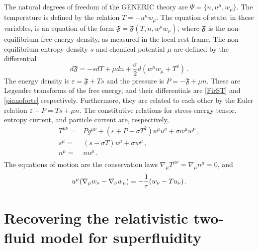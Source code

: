 \documentclass[a4paper, amsfonts, amssymb, amsmath, reprint, showkeys, nofootinbib, twoside, onecolumn, notitlepage]{revtex4-1}
\begin{document}
The natural degrees of freedom of the GENERIC theory are $\Psi=\{n,u^\mu,w_\mu \}$. The temperature is defined by the relation $T=-u^\mu w_\mu$. The equation of state, in these variables, is an equation of the form $\mathfrak{F}=\mathfrak{F}(T,n,w^\mu w_\mu)$, where $\mathfrak{F}$ is the non-equilibrium free energy density, as measured in the local rest frame. The non-equilibrium entropy density $s$ and chemical potential $\mu$ are defined by the differential
\begin{equation}
    d\mathfrak{F}=-sdT+\mu dn +\dfrac{\sigma}{2}d(w^\mu w_\mu +T^2) \, .
\end{equation}
The energy density is $\varepsilon=\mathfrak{F}+Ts$ and the pressure is $P=-\mathfrak{F}+\mu n$. These are Legendre transforms of the free energy, and their differentials are \eqref{FirST} and \eqref{pianoforte} respectively. Furthermore, they are related to each other by the Euler relation $\varepsilon+P=Ts+\mu n$. The constitutive relations for stress-energy tensor, entropy current, and particle current are, respectively,
\begin{equation}
    \begin{split}
T^{\mu \nu}={}& Pg^{\mu \nu}+(\varepsilon{+}P{-}\sigma T^2 )u^\mu u^\nu+\sigma w^\mu w^\nu \, , \\
s^\mu ={}& (s{-}\sigma T)u^\mu +\sigma w^\mu \, ,\\
n^\mu ={}& n u^\mu \, . \\
    \end{split}
\end{equation}
The equations of motion are the conservation laws $\nabla_\mu T^{\mu \nu}=\nabla_\mu n^\mu =0$, and
\begin{equation}
   u^\mu (\nabla_\mu w_\nu -\nabla_\nu w_\mu)=-\dfrac{1}{\tau} (w_\nu-Tu_\nu)\, .\\ 
\end{equation}



\section{Recovering the relativistic two-fluid model for superfluidity}\label{RSH}
\end{document}
